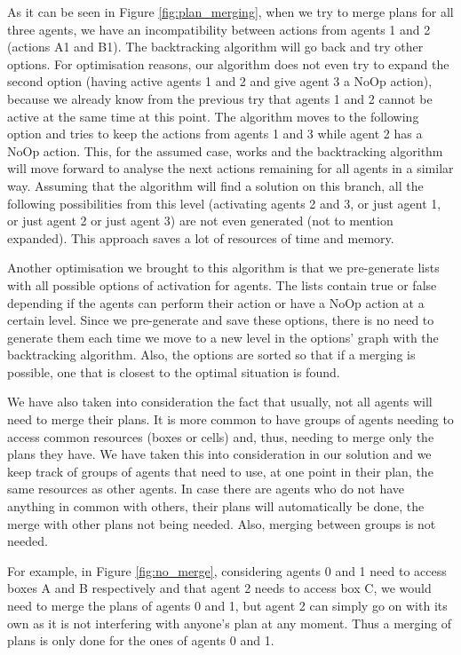 As it can be seen in Figure \ref{fig:plan_merging}, when we try to merge plans for all three agents, we have
an incompatibility between actions from agents 1 and 2 (actions A1 and B1). The backtracking algorithm will go
back and try other options. For optimisation reasons, our algorithm does not even try to expand the second
option (having active agents 1 and 2 and give agent 3 a NoOp action), because we already know from the
previous try that agents 1 and 2 cannot be active at the same time at this point. The algorithm moves to the
following option and tries to keep the actions from agents 1 and 3 while agent 2 has a NoOp action. This, for
the assumed case, works and the backtracking algorithm will move forward to analyse the next actions remaining
for all agents in a similar way. Assuming that the algorithm will find a solution on this branch, all the
following possibilities from this level (activating agents 2 and 3, or just agent 1, or just agent 2 or just
agent 3) are not even generated (not to mention expanded). This approach saves a lot of resources of time and
memory.

Another optimisation we brought to this algorithm is that we pre-generate lists with all possible options of
activation for agents. The lists contain true or false depending if the agents can perform their action or
have a NoOp action at a certain level. Since we pre-generate and save these options, there is no need to
generate them each time we move to a new level in the options’ graph with the backtracking algorithm. Also,
the options are sorted so that if a merging is possible, one that is closest to the optimal situation is
found.

We have also taken into consideration the fact that usually, not all agents will need to merge their plans. It
is more common to have groups of agents needing to access common resources (boxes or cells) and, thus, needing
to merge only the plans they have. We have taken this into consideration in our solution and we keep track of
groups of agents that need to use, at one point in their plan, the same resources as other agents. In case
there are agents who do not have anything in common with others, their plans will automatically be done, the
merge with other plans not being needed. Also, merging between groups is not needed.

For example, in Figure \ref{fig:no_merge}, considering agents 0 and 1 need to access boxes A and B
respectively and that agent 2 needs to access box C, we would need to merge the plans of agents 0 and 1, but
agent 2 can simply go on with its own as it is not interfering with anyone's plan at any moment. Thus a
merging of plans is only done for the ones of agents 0 and 1.

